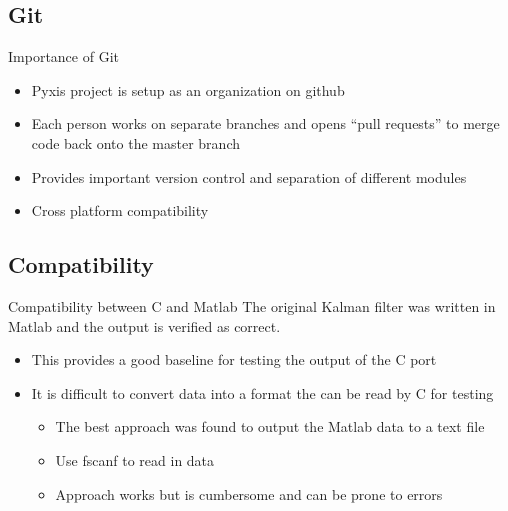 \documentclass[10pt, handout, aspectratio=169]{beamer}
\begin{document}
\subsection{Git}
	\begin{frame}{Importance of Git}
		\begin{itemize}
			\item Pyxis project is setup as an organization on github
			\item Each person works on separate branches and opens ``pull requests'' to merge code back onto the master branch
			\item Provides important version control and separation of different modules
			\item Cross platform compatibility
		\end{itemize}
	\end{frame}

\subsection{Compatibility}
	\begin{frame}{Compatibility between C and Matlab}
		The original Kalman filter was written in Matlab and the output is verified as correct.
		\begin{itemize}
			\item This provides a good baseline for testing the output of the C port
			\item It is difficult to convert data into a format the can be read by C for testing
				\begin{itemize}
					\item The best approach was found to output the Matlab data to a text file
					\item Use fscanf to read in data
					\item Approach works but is cumbersome and can be prone to errors
				\end{itemize}
			\end{itemize}
	\end{frame}
\end{document}
